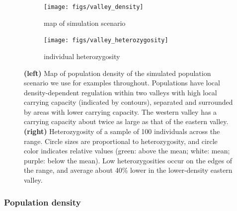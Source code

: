 \documentclass{ar-1col}
\newcommand{\todo}[1]{{\textbf{\color{red}{#1}}}}
\begin{document}
\begin{figure}	%
    \centering
    \begin{subfigure}{0.95\textwidth}
        \centering
        \texttt{[image: figs/valley\_density]}
        \caption{map of simulation scenario}
        \label{valley_map}
    \end{subfigure}
    \begin{subfigure}{0.95\textwidth}
        \centering
        \texttt{[image: figs/valley\_heterozygosity]}
        \caption{individual heterozygosity}
        \label{valley_het}
    \end{subfigure}
        \caption{
            \textbf{(left)} Map of population density of the simulated population scenario
            we use for examples throughout.
            Populations have local density-dependent regulation
            within two valleys with high local carrying capacity (indicated by contours),
            separated and surrounded by areas with lower carrying capacity.
            The western valley has a carrying capacity about twice as large as that of the eastern valley.
            \textbf{(right)} Heterozygosity of a sample of 100 individuals across the range.
            Circle sizes are proportional to heterozygosity,
            and circle color indicates relative values
            (green: above the mean; white: mean; purple: below the mean).
            Low heterozygosities occur on the edges of the range,
            and average about 40\% lower in the lower-density eastern valley.
		}
        \label{pop_density}
\end{figure}



\subsubsection{Population density}
\todo{a little long - need to cut some}
\end{document}
